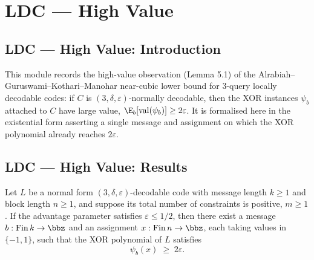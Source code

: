 \section{LDC --- High Value}
\subsection*{LDC --- High Value: Introduction}

This module records the high-value observation (Lemma 5.1) of the
Alrabiah--Guruswami--Kothari--Manohar near-cubic lower bound for $3$-query locally
decodable codes: if $C$ is $(3,\delta,\varepsilon)$-normally decodable, then the XOR
instances $\psi_b$ attached to $C$ have large value, $\E_b[\mathrm{val}(\psi_b)] \ge
2\varepsilon$. It is formalised here in the existential form asserting a single message
and assignment on which the XOR polynomial already reaches $2\varepsilon$.

\subsection*{LDC --- High Value: Results}

\begin{theorem}
\label{high_value_observation}
\leanok
{}
Let $L$ be a normal form $(3,\delta,\varepsilon)$-decodable code with message length $k
\ge 1$ and block length $n \ge 1$, and suppose its total number of constraints is
positive, $m \ge 1$. If the advantage parameter satisfies $\varepsilon \le 1/2$, then
there exist a message $b : \mathrm{Fin}\,k \to \bbz$ and an assignment $x :
\mathrm{Fin}\,n \to \bbz$, each taking values in $\{-1, 1\}$, such that the XOR
polynomial of $L$ satisfies
\[
  \psi_b(x) \;\ge\; 2\varepsilon .
\]
\end{theorem}
